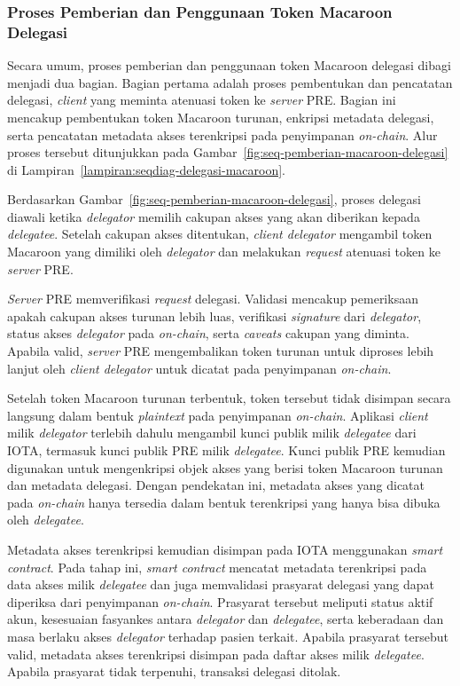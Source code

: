 \subsubsection{Proses Pemberian dan Penggunaan Token Macaroon Delegasi}
\label{subsubsec:proses-pemberian-dan-penggunaan-macaroon-delegasi}

Secara umum, proses pemberian dan penggunaan token Macaroon delegasi dibagi menjadi dua bagian. Bagian pertama adalah proses pembentukan dan pencatatan delegasi, \textit{client} yang meminta atenuasi token ke \textit{server} PRE. Bagian ini mencakup pembentukan token Macaroon turunan, enkripsi metadata delegasi, serta pencatatan metadata akses terenkripsi pada penyimpanan \textit{on-chain}. Alur proses tersebut ditunjukkan pada Gambar~\ref{fig:seq-pemberian-macaroon-delegasi} di Lampiran~\ref{lampiran:seqdiag-delegasi-macaroon}.

Berdasarkan Gambar~\ref{fig:seq-pemberian-macaroon-delegasi}, proses delegasi diawali ketika \textit{delegator} memilih cakupan akses yang akan diberikan kepada \textit{delegatee}. Setelah cakupan akses ditentukan, \textit{client delegator} mengambil token Macaroon yang dimiliki oleh \textit{delegator} dan melakukan \textit{request} atenuasi token ke \textit{server} PRE.

\textit{Server} PRE memverifikasi \textit{request} delegasi. Validasi mencakup pemeriksaan apakah cakupan akses turunan lebih luas, verifikasi \textit{signature} dari \textit{delegator}, status akses \textit{delegator} pada \textit{on-chain}, serta \textit{caveats} cakupan yang diminta. Apabila valid, \textit{server} PRE mengembalikan token turunan untuk diproses lebih lanjut oleh \textit{client delegator} untuk dicatat pada penyimpanan \textit{on-chain}.

Setelah token Macaroon turunan terbentuk, token tersebut tidak disimpan secara langsung dalam bentuk \textit{plaintext} pada penyimpanan \textit{on-chain}. Aplikasi \textit{client} milik \textit{delegator} terlebih dahulu mengambil kunci publik milik \textit{delegatee} dari IOTA, termasuk kunci publik PRE milik \textit{delegatee}. Kunci publik PRE kemudian digunakan untuk mengenkripsi objek akses yang berisi token Macaroon turunan dan metadata delegasi. Dengan pendekatan ini, metadata akses yang dicatat pada \textit{on-chain} hanya tersedia dalam bentuk terenkripsi yang hanya bisa dibuka oleh \textit{delegatee}.

Metadata akses terenkripsi kemudian disimpan pada IOTA menggunakan \textit{smart contract}. Pada tahap ini, \textit{smart contract} mencatat metadata terenkripsi pada data akses milik \textit{delegatee} dan juga memvalidasi prasyarat delegasi yang dapat diperiksa dari penyimpanan \textit{on-chain}. Prasyarat tersebut meliputi status aktif akun, kesesuaian fasyankes antara \textit{delegator} dan \textit{delegatee}, serta keberadaan dan masa berlaku akses \textit{delegator} terhadap pasien terkait. Apabila prasyarat tersebut valid, metadata akses terenkripsi disimpan pada daftar akses milik \textit{delegatee}. Apabila prasyarat tidak terpenuhi, transaksi delegasi ditolak.

